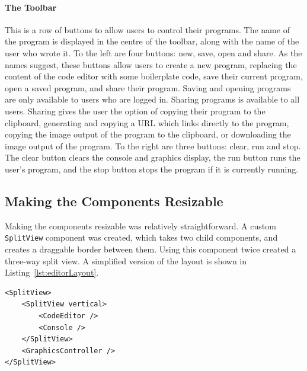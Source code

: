 \documentclass[../main.tex]{subfiles}
\begin{document}
                \paragraph{The Toolbar}
                    This is a row of buttons to allow users to control their programs.
                    The name of the program is displayed in the centre of the toolbar, along with
                        the name of the user who wrote it.
                    To the left are four buttons: new, save, open and share.
                    As the names suggest, these buttons allow users to create a new program,
                        replacing the content of the code editor with some boilerplate code, save their
                        current program, open a saved program, and share their program.
                    Saving and opening programs are only available to users who are logged in.
                    Sharing programs is available to all users.
                    Sharing gives the user the option of copying their program to the clipboard,
                        generating and copying a URL which links directly to the program, copying the
                        image output of the program to the clipboard, or downloading the image output
                        of the program.
                    To the right are three buttons: clear, run and stop.
                    The clear button clears the console and graphics display, the run button runs
                        the user's program, and the stop button stops the program if it is currently
                        running.

        \subsection{Making the Components Resizable}
            Making the components resizable was relatively straightforward.
            A custom \texttt{SplitView} component was created, which takes two child
                components, and creates a draggable border between them.
            Using this component twice created a three-way split view.
            A simplified version of the layout is shown in Listing~\ref{lst:editorLayout}.

            \begin{lstlisting}[caption={A simplified version of the editor page  layout.}, 
                label={lst:editorLayout}]
<SplitView>
    <SplitView vertical>
        <CodeEditor />
        <Console />
    </SplitView>
    <GraphicsController />
</SplitView>\end{lstlisting}
\end{document}
